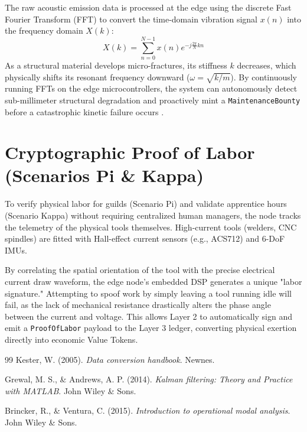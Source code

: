 The raw acoustic emission data is processed at the edge using the discrete Fast Fourier Transform (FFT) to convert the time-domain vibration signal $x(n)$ into the frequency domain $X(k)$:
\begin{equation}
X(k) = \sum_{n=0}^{N-1} x(n) e^{-j \frac{2\pi}{N} k n}
\end{equation}
As a structural material develops micro-fractures, its stiffness $k$ decreases, which physically shifts its resonant frequency downward ($\omega = \sqrt{k/m}$). By continuously running FFTs on the edge microcontrollers, the system can autonomously detect sub-millimeter structural degradation and proactively mint a \texttt{MaintenanceBounty} before a catastrophic kinetic failure occurs \cite{brincker2015introduction}.

\section{Cryptographic Proof of Labor (Scenarios Pi \& Kappa)}
To verify physical labor for guilds (Scenario Pi) and validate apprentice hours (Scenario Kappa) without requiring centralized human managers, the node tracks the telemetry of the physical tools themselves. High-current tools (welders, CNC spindles) are fitted with Hall-effect current sensors (e.g., ACS712) and 6-DoF IMUs.

By correlating the spatial orientation of the tool with the precise electrical current draw waveform, the edge node's embedded DSP generates a unique "labor signature." Attempting to spoof work by simply leaving a tool running idle will fail, as the lack of mechanical resistance drastically alters the phase angle between the current and voltage. This allows Layer 2 to automatically sign and emit a \texttt{ProofOfLabor} payload to the Layer 3 ledger, converting physical exertion directly into economic Value Tokens.

\vspace{1cm}
\begin{thebibliography}{99}
Kester, W. (2005). \textit{Data conversion handbook}. Newnes.

Grewal, M. S., \& Andrews, A. P. (2014). \textit{Kalman filtering: Theory and Practice with MATLAB}. John Wiley \& Sons.

Brincker, R., \& Ventura, C. (2015). \textit{Introduction to operational modal analysis}. John Wiley \& Sons.
\end{thebibliography}
